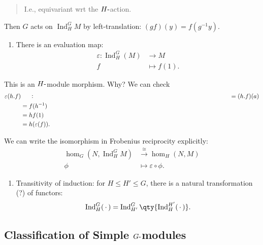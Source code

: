\begin{quote}
I.e., equivariant wrt the \(H{\hbox{-}}\)action.
\end{quote}

Then \(G\) acts on \(\operatorname{Ind}_H^G M\) by left-translation:
\((gf)(y) = f(g^{-1} y)\).

\begin{enumerate}
\def\labelenumi{\arabic{enumi}.}
\setcounter{enumi}{6}
\tightlist
\item
  There is an evaluation map:
  \begin{align*}       \varepsilon: \operatorname{Ind}_H^G(M) &\to M \\      f&\mapsto f(1)     .\end{align*}
\end{enumerate}

This is an \(H{\hbox{-}}\)module morphism. Why? We can check
\begin{align*}   \varepsilon(h.f)  &\mathrel{\vcenter{:}}=(h.f)(a) \\ &= f(h^{-1} ) \\ &= hf(1) \\ &= h(\varepsilon(f)) .\end{align*}

We can write the isomorphism in Frobenius reciprocity explicitly:
\begin{align*}   \hom_G(N, \operatorname{Ind}_H^G M) &\xrightarrow{\cong} \hom_H(N, M) \\ \phi & \mapsto \varepsilon\circ \phi .\end{align*}

\begin{enumerate}
\def\labelenumi{\arabic{enumi}.}
\setcounter{enumi}{7}
\tightlist
\item
  Transitivity of induction: for \(H\leq H' \leq G\), there is a natural
  transformation (?) of functors:
  \begin{align*}       \operatorname{Ind}_H^G({\,\cdot\,}) = \operatorname{Ind}_{H'}^G\qty{\operatorname{Ind}_H^{H'}({\,\cdot\,}) }     .\end{align*}
\end{enumerate}


\hypertarget{classification-of-simple-ghbox-modules}{%
\subsection{\texorpdfstring{Classification of Simple
\(G{\hbox{-}}\)modules}{Classification of Simple G\{\textbackslash hbox\{-\}\}modules}}\label{classification-of-simple-ghbox-modules}}

